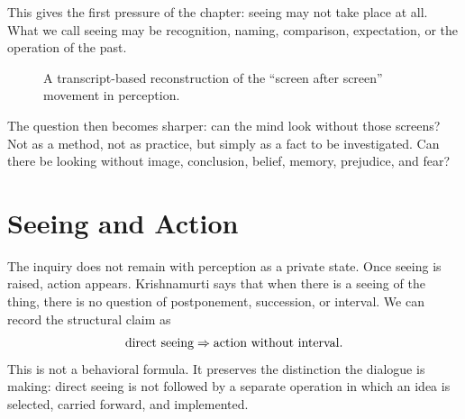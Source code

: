 This gives the first pressure of the chapter: seeing may not take place at all. What we call seeing may be recognition, naming, comparison, expectation, or the operation of the past.

\begin{figure}
\centering
{}
\caption{A transcript-based reconstruction of the ``screen after screen'' movement in perception.}
\end{figure}

The question then becomes sharper: can the mind look without those screens? Not as a method, not as practice, but simply as a fact to be investigated. Can there be looking without image, conclusion, belief, memory, prejudice, and fear?

\section{Seeing and Action}

The inquiry does not remain with perception as a private state. Once seeing is raised, action appears. Krishnamurti says that when there is a seeing of the thing, there is no question of postponement, succession, or interval. We can record the structural claim as
\begin{equation}
\hbox{direct seeing}
\Rightarrow
\hbox{action without interval}.
\end{equation}
This is not a behavioral formula. It preserves the distinction the dialogue is making: direct seeing is not followed by a separate operation in which an idea is selected, carried forward, and implemented.

